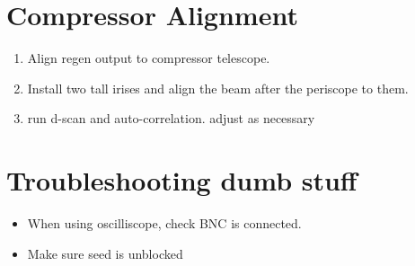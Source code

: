 \documentclass{article}
\begin{document}
\section{Compressor Alignment}
\begin{enumerate}
    \item Align regen output to compressor telescope.
    \item Install two tall irises and align the beam after the periscope to them.
    \item run d-scan and auto-correlation. adjust as necessary
\end{enumerate}

\section{Troubleshooting dumb stuff}
\begin{itemize}
    \item When using oscilliscope, check BNC is connected.
    \item Make sure seed is unblocked
\end{itemize}
\end{document}
